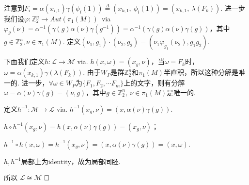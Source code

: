 \documentclass{article}
\theoremstyle{plain}%
\theoremstyle{definition}
\theoremstyle{remark}
\begin{document}
{%
注意到$F_i=\alpha(x_{i,1})\gamma(\phi_i(1))\overset{\Delta}{=}(x_{k,1},~\phi_i(1))=(x_{k,1},~\lambda(F_k))$.
进一步我们设$\varphi:\mathbb{Z}_2^n\longrightarrow Aut(\pi_1(M))$~via ~$\varphi_g(\nu)=\alpha^{-1}(\gamma(g)\alpha(\nu)\gamma(g^{-1}))=\alpha^{-1}(\gamma(g)\alpha(\nu)\gamma(g))$，其中$g\in \mathbb{Z}_2^n, \nu\in \pi_1(M)$. 定义$(\nu_1,g_1)\cdot(\nu_2,g_2)=(\nu_1\varphi_{g_1}(\nu_2),g_1g_2)$.

下面我们定义$h:\mathcal{L}\longrightarrow \mathcal{M}$ via. $h(x,\omega)=(x_g,\nu)$，当$\omega=F_k$时，$\omega=\alpha(x_{k,1})\gamma(\lambda(F_k))$. 由于$W_P$是群$\mathbb{Z}_2^n$和$\pi_1(M)$半直积，所以这种分解是唯一的. 进一步，$\forall\omega\in W_P$为$\{F_1,F_2,\cdots F_m\}$上的文字，则有分解$\omega=\alpha(\nu)\gamma(g)=(\nu,g)$，其中$g\in\mathbb{Z}_2^n,~\nu\in \pi_1(M)$是唯一的. 

定义$h^{-1}:\mathcal{M}\longrightarrow \mathcal{L}$ via.
$h^{-1}(x_g,\nu)=(x,\alpha(\nu)\gamma(g))$.

$h\circ h^{-1}(x_g,\nu)=h(x,\alpha(\nu)\gamma(g))=(x_g,\nu)$；

$h^{-1}\circ h(x,\omega)=h^{-1}(x_g,\nu)=(x,\alpha(\nu)\gamma(g))=(x,\omega)$.

$h,h^{-1}$局部上为identity，故为局部同胚.

所以 $\mathcal{L}\cong \mathcal{M}$  $\hfill{} \Box$


}
\end{document}
